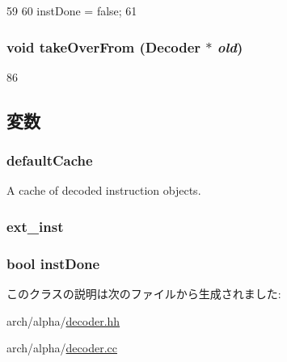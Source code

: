 \begin{DoxyCode}
59     {
60         instDone = false;
61     }
\end{DoxyCode}
\hypertarget{classAlphaISA_1_1Decoder_a83393f90e7cbd98eda9721ba6022d0e0}{
\subsubsection[{takeOverFrom}]{\setlength{\rightskip}{0pt plus 5cm}void takeOverFrom ({\bf Decoder} $\ast$ {\em old})}}
\label{classAlphaISA_1_1Decoder_a83393f90e7cbd98eda9721ba6022d0e0}



\begin{DoxyCode}
86 {}
\end{DoxyCode}


\subsection{変数}
\hypertarget{classAlphaISA_1_1Decoder_a8800313f93afe356e1177866068cc8d6}{
\subsubsection[{defaultCache}]{ {\bf defaultCache}}}
\label{classAlphaISA_1_1Decoder_a8800313f93afe356e1177866068cc8d6}


A cache of decoded instruction objects. \hypertarget{classAlphaISA_1_1Decoder_a45b15fdde7b9f97351b37a784e76fcb2}{
\subsubsection[{ext\_\-inst}]{ {\bf ext\_\-inst}}}
\label{classAlphaISA_1_1Decoder_a45b15fdde7b9f97351b37a784e76fcb2}
\hypertarget{classAlphaISA_1_1Decoder_a37c5d55785204b8fd00a8ebf62e1fc33}{
\subsubsection[{instDone}]{\setlength{\rightskip}{0pt plus 5cm}bool {\bf instDone}}}
\label{classAlphaISA_1_1Decoder_a37c5d55785204b8fd00a8ebf62e1fc33}


このクラスの説明は次のファイルから生成されました:\begin{DoxyCompactItemize}
\item 
arch/alpha/\hyperlink{alpha_2decoder_8hh}{decoder.hh}\item 
arch/alpha/\hyperlink{alpha_2decoder_8cc}{decoder.cc}\end{DoxyCompactItemize}
